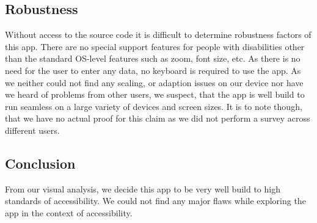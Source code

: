 \subsection*{Robustness}
Without access to the source code it is difficult to determine robustness factors of this app. There are no special support features for people with disabilities other than the standard OS-level features such as zoom, font size, etc.
As there is no need for the user to enter any data, no keyboard is required to use the app. 
As we neither could not find any scaling, or adaption issues on our device nor have we heard of problems from other users, we suspect, that the app is well build to run seamless on a large variety of devices and screen sizes. It is to note though, that we have no actual proof for this claim as we did not perform a survey across different users.

\subsection*{Conclusion}
From our visual analysis, we decide this app to be very well build to high standards of accessibility. We could not find any major flaws while exploring the app in the context of accessibility.













